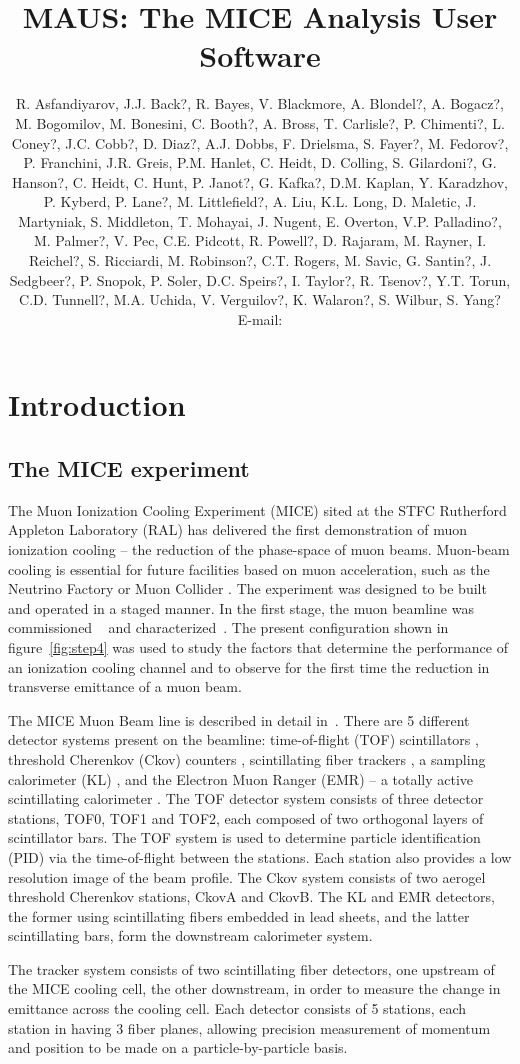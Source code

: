 \documentclass{JINST}
\title{MAUS: The MICE Analysis User Software}
\author{R. Asfandiyarov, J.J. Back?, R. Bayes, V. Blackmore, A. Blondel?, A. Bogacz?, M. Bogomilov, M. Bonesini, C. Booth?, A. Bross, T. Carlisle?, P. Chimenti?, L. Coney?, J.C. Cobb?, D. Diaz?, A.J. Dobbs, F. Drielsma, S. Fayer?, M. Fedorov?, P. Franchini, J.R. Greis, P.M. Hanlet, C. Heidt, D. Colling, S. Gilardoni?, G. Hanson?, C. Heidt, C. Hunt, P. Janot?, G. Kafka?, D.M. Kaplan, Y. Karadzhov, P. Kyberd, P. Lane?, M. Littlefield?, A. Liu, K.L. Long, D. Maletic, J. Martyniak, S. Middleton, T. Mohayai, J. Nugent, E. Overton, V.P. Palladino?, M. Palmer?, V. Pec, C.E. Pidcott, R. Powell?, D. Rajaram, M. Rayner, I. Reichel?, S. Ricciardi, M. Robinson?, C.T. Rogers, M. Savic, G. Santin?, J. Sedgbeer?, P. Snopok, P. Soler, D.C. Speirs?, I. Taylor?, R. Tsenov?, Y.T. Torun, C.D. Tunnell?, M.A. Uchida, V. Verguilov?, K. Walaron?, S. Wilbur, S. Yang?
\\
E-mail: \email{durga@fnal.gov}}
\begin{document}
\linenumbers

\section{Introduction}\label{sec:intro}

\subsection{The MICE experiment} \label{sec:mice}
The Muon Ionization Cooling Experiment (MICE) sited at the STFC Rutherford Appleton Laboratory (RAL) has delivered the first demonstration of muon ionization cooling -- the reduction of the phase-space of muon beams. Muon-beam cooling is essential for future facilities based on muon acceleration, such as the Neutrino Factory or Muon Collider \cite{IDR, MC_Overview}. The experiment was designed to be built and operated in a staged manner. In the first stage, the muon beamline was commissioned  ~\cite{BeamlineJINST} and characterized~\cite{BeamCharacterisationEurPhysJ}. The present configuration shown in figure~\ref{fig:step4}  was used to study the factors that determine the performance of an ionization cooling channel and to observe for the first time the reduction in transverse emittance of a muon beam.

The MICE Muon Beam line is described in detail in~\cite{BeamlineJINST}. There are 5 different detector systems present on the beamline: time-of-flight (TOF) scintillators \cite{NIMA_TOF}, threshold Cherenkov (Ckov) counters \cite{CkovIEEE}, scintillating fiber trackers \cite{TrackersNIM}, a sampling calorimeter (KL) \cite{BeamCharacterisationEurPhysJ}, and the Electron Muon Ranger (EMR) -- a totally active scintillating calorimeter \cite{EMRJINST11}. The TOF detector system consists of three detector stations, TOF0, TOF1 and TOF2, each composed of two orthogonal layers of scintillator bars. The TOF system is used to determine particle identification (PID) via the time-of-flight between the stations. Each station also provides a low resolution image of the beam profile.  The Ckov system consists of two aerogel threshold Cherenkov stations, CkovA and CkovB. The KL and EMR detectors, the former using scintillating fibers embedded in lead sheets, and the latter scintillating bars, form the downstream calorimeter system.

The tracker system consists of two scintillating fiber detectors, one upstream of the MICE cooling cell, the other downstream, in order to measure the change in emittance across the cooling cell. Each detector consists of 5 stations, each station in having 3 fiber planes, allowing precision measurement of momentum and position to be made on a particle-by-particle basis.
\end{document}
